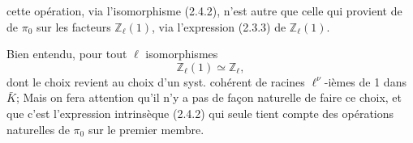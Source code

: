 
cette opération, via l'isomorphisme (2.4.2),  n'est autre que celle qui provient de   de $\pi_0$ sur les facteurs $\mathbb Z_\ell(1)$, via l'expression (2.3.3) de $\mathbb Z_\ell(1)$.

Bien entendu, pour tout $\ell$   isomorphismes
\[
\mathbb Z_\ell(1)\simeq\mathbb Z_\ell,
\]
dont le choix revient au choix d'un syst. cohérent de racines  $\ell^\nu$-ièmes de 1 dans $\bar K$; Mais on fera attention qu'il n'y a pas de façon naturelle de faire ce choix, et que c'est l'expression intrinsèque (2.4.2) qui seule  tient compte des opérations naturelles de $\pi_0$ sur le premier membre.
